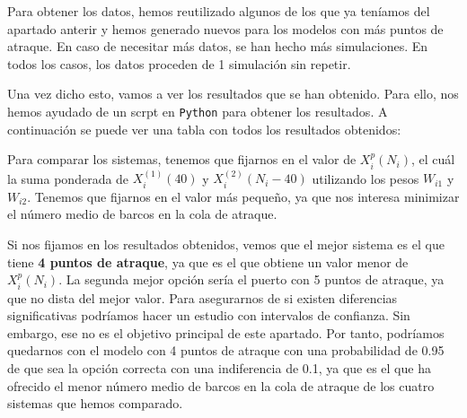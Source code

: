 \documentclass[11pt,a4paper]{article}
\begin{document}
Para obtener los datos, hemos reutilizado algunos de los que ya teníamos del
apartado anterir y hemos generado nuevos para los modelos con más puntos de
atraque. En caso de necesitar más datos, se han hecho más simulaciones. En todos
los casos, los datos proceden de 1 simulación sin repetir.

Una vez dicho esto, vamos a ver los resultados que se han obtenido. Para ello,
nos hemos ayudado de un scrpt en \texttt{Python} para obtener los resultados.
A continuación se puede ver una tabla con todos los resultados obtenidos:

\begin{table}[H]
\centering
{}
\caption{Resultados del método de selección del mejor sistema entre $k$.}
\label{tab:mejor-sistema}
\end{table}

Para comparar los sistemas, tenemos que fijarnos en el valor de $X^p_i(N_i)$, el cuál
la suma ponderada de $X_i^{(1)}(40)$ y $X_i^{(2)}(N_i - 40)$ utilizando los pesos
$W_{i1}$ y $W_{i2}$. Tenemos que fijarnos en el valor más pequeño, ya que nos interesa
minimizar el número medio de barcos en la cola de atraque.

Si nos fijamos en los resultados obtenidos, vemos que el mejor sistema es el
que tiene \textbf{4 puntos de atraque}, ya que es el que obtiene un valor menor
de $X^p_i(N_i)$. La segunda mejor opción sería el puerto con 5 puntos de atraque,
ya que no dista del mejor valor. Para asegurarnos de si existen diferencias significativas
podríamos hacer un estudio con intervalos de confianza. Sin embargo, ese no es
el objetivo principal de este apartado. Por tanto, podríamos quedarnos con el
modelo con 4 puntos de atraque con una probabilidad de 0.95 de que sea la opción correcta
con una indiferencia de 0.1, ya que es el que ha ofrecido el menor número
medio de barcos en la cola de atraque de los cuatro sistemas que hemos comparado. 
\end{document}
